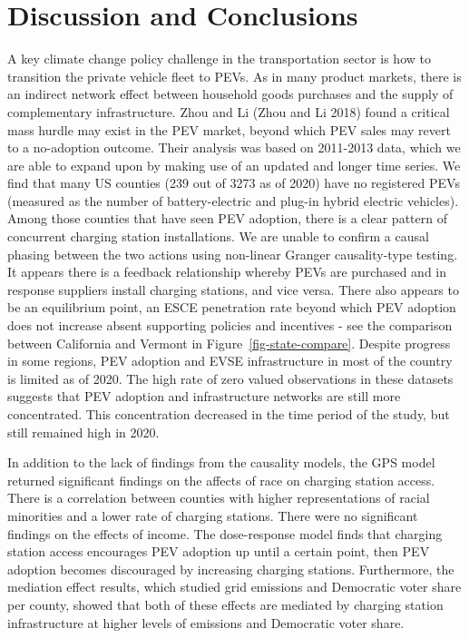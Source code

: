 \documentclass[
  letterpaper,
  DIV=11,
  numbers=noendperiod]{scrartcl}
\begin{document}
\hypertarget{discussion-and-conclusions}{%
\section{Discussion and Conclusions}\label{discussion-and-conclusions}}

A key climate change policy challenge in the transportation sector is
how to transition the private vehicle fleet to PEVs. As in many product
markets, there is an indirect network effect between household goods
purchases and the supply of complementary infrastructure. Zhou and Li
(Zhou and Li 2018) found a critical mass hurdle may exist in the PEV
market, beyond which PEV sales may revert to a no-adoption outcome.
Their analysis was based on 2011-2013 data, which we are able to expand
upon by making use of an updated and longer time series. We find that
many US counties (239 out of 3273 as of 2020) have no registered PEVs
(measured as the number of battery-electric and plug-in hybrid electric
vehicles). Among those counties that have seen PEV adoption, there is a
clear pattern of concurrent charging station installations. We are
unable to confirm a causal phasing between the two actions using
non-linear Granger causality-type testing. It appears there is a
feedback relationship whereby PEVs are purchased and in response
suppliers install charging stations, and vice versa. There also appears
to be an equilibrium point, an ESCE penetration rate beyond which PEV
adoption does not increase absent supporting policies and incentives -
see the comparison between California and Vermont in
Figure~\ref{fig-state-compare}. Despite progress in some regions, PEV
adoption and EVSE infrastructure in most of the country is limited as of
2020. The high rate of zero valued observations in these datasets
suggests that PEV adoption and infrastructure networks are still more
concentrated. This concentration decreased in the time period of the
study, but still remained high in 2020.

In addition to the lack of findings from the causality models, the GPS
model returned significant findings on the affects of race on charging
station access. There is a correlation between counties with higher
representations of racial minorities and a lower rate of charging
stations. There were no significant findings on the effects of income.
The dose-response model finds that charging station access encourages
PEV adoption up until a certain point, then PEV adoption becomes
discouraged by increasing charging stations. Furthermore, the mediation
effect results, which studied grid emissions and Democratic voter share
per county, showed that both of these effects are mediated by charging
station infrastructure at higher levels of emissions and Democratic
voter share.
\end{document}
